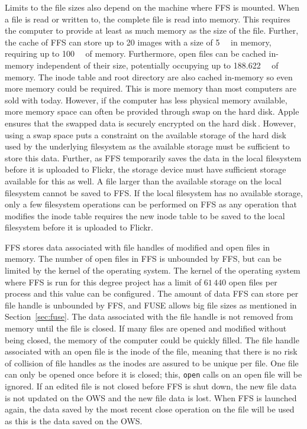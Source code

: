 Limits to the file sizes also depend on the machine where \gls{FFS} is mounted. When a file is read or written to, the complete file is read into memory. This requires the computer to provide at least as much memory as the size of the file. Further, the cache of \gls{FFS} can store up to 20 images with a size of \SI{5}{\mega\byte} in memory, requiring up to \SI{100}{\mega\byte} of memory. Furthermore, open files can be cached in-memory independent of their size, potentially occupying up to \SI{188.622}{\giga\byte} of memory. The inode table and root directory are also cached \mbox{in-memory} so even more memory could be required. This is more memory than most computers are sold with today. However, if the computer has less physical memory available, more memory space can often be provided through swap on the hard disk. Apple ensures that the swapped data is securely encrypted on the hard disk\,\cite{appleinc.WhatSecureVirtual2022}. However, using a swap space puts a constraint on the available storage of the hard disk used by the underlying filesystem as the available storage must be sufficient to store this data. Further, as \gls{FFS} temporarily saves the data in the local filesystem before it is uploaded to Flickr, the storage device must have sufficient storage available for this as well. A file larger than the available storage on the local filesystem cannot be saved to \gls{FFS}. If the local filesystem has no available storage, only a few filesystem operations can be performed on \gls{FFS} as any operation that modifies the inode table requires the new inode table to be saved to the local filesystem before it is uploaded to Flickr. 

\gls{FFS} stores data associated with file handles of modified and open files in memory. The number of open files in \gls{FFS} is unbounded by \gls{FFS}, but can be limited by the kernel of the operating system. The kernel of the operating system where \gls{FFS} is run for this degree project has a limit of $61\,440$ open files per process and this value can be configured\,\cite{kryptedMaximumFilesMac2009}. The amount of data \gls{FFS} can store per file handle is unbounded by \gls{FFS}, and \gls{FUSE} allows big file sizes as mentioned in Section~\ref{sec:fuse}. The data associated with the file handle is not removed from memory until the file is closed. If many files are opened and modified without being closed, the memory of the computer could be quickly filled. The file handle associated with an open file is the inode of the file, meaning that there is no risk of collision of file handles as the inodes are assured to be unique per file. One file can only be opened once before it is closed; this, \texttt{open} calls on an open file will be ignored. If an edited file is not closed before \gls{FFS} is shut down, the new file data is not updated on the \gls{OWS} and the new file data is lost. When \gls{FFS} is launched again, the data saved by the most recent close operation on the file will be used as this is the data saved on the \gls{OWS}.

